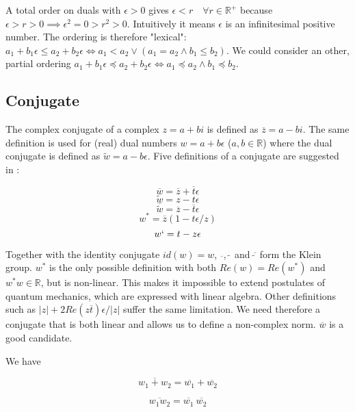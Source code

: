 \documentclass{article}
\newcommand{\R}{\mathbb{R}}
\newcommand{\e}{\epsilon}
\newcommand{\til}{\widetilde}
\renewcommand{\bar}{\overline}
\begin{document}
A total order on duals with $\e > 0$ gives $\e < r \quad \forall r \in \R^+$ because $\e > r > 0 \implies \e^2 = 0 > r^2 > 0$. Intuitively it means $\e$ is an infinitesimal positive number. The ordering is therefore "lexical": $a_1 + b_1 \e \leq a_2 + b_2 \e \iff a_1 < a_2 \lor (a_1 = a_2 \land b_1 \leq b_2)$. We could consider an other, partial ordering $a_1 + b_1 \e \preceq a_2 + b_2 \e \iff a_1 \preceq a_2 \land b_1 \preceq b_2$.

\subsection{Conjugate}

The complex conjugate of a complex $z = a + bi$ is defined as $\bar{z} = a - bi$. The same definition is used for (real) dual numbers $w = a + b\e$ ($a, b \in \R$) where the dual conjugate is defined as $\til{w} = a - b \e$. Five definitions of a conjugate are suggested in \cite{messelmi2015}:

\begin{equation}
\bar{w} = \bar{z} + \bar{t}\e
\end{equation}
\begin{equation}
\til{w} = z - t\e
\end{equation}
\begin{equation}
\bar{\til{w}} = \bar{z} - \bar{t}\e
\end{equation}
\begin{equation}
w^* = \bar{z}(1-t\e/z)
\end{equation}
\begin{equation}
w` = t - z \e
\end{equation}

Together with the identity conjugate $id(w) = w$, $\bar{~}$, $\til{~}$ and $\bar{\til{~}}$ form the Klein group. $w^*$ is the only possible definition with both $Re(w) = Re(w^*)$ and $w^*w \in \R$, but is non-linear. This makes it impossible to extend postulates of quantum mechanics, which are expressed with linear algebra. Other definitions such as $|z| + 2Re(z\bar{t})\e/|z|$ suffer the same limitation. We need therefore a conjugate that is both linear and allows us to define a non-complex norm. $\bar{w}$ is a good candidate.

We have

\begin{equation}
\bar{w_1 + w_2} = \bar{w_1} + \bar{w_2}
\end{equation}

\begin{equation}
\bar{w_1  w_2} = \bar{w_1} ~ \bar{w_2}
\end{equation}
\end{document}
